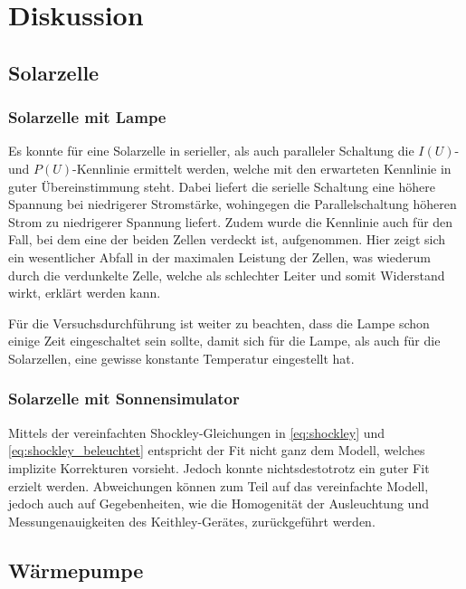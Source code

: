 \documentclass[english, ngerman]{scrartcl}
\begin{document}
\section{Diskussion}
\label{sec:diskussion}

\subsection{Solarzelle}
\label{subsec:diskussion_solar}

\subsubsection{Solarzelle mit Lampe}
\label{subsubsec:diskussion_solar_lampe}

Es konnte für eine Solarzelle in serieller, als auch paralleler Schaltung die $I(U)$- und $P(U)$-Kennlinie ermittelt werden, welche mit den erwarteten Kennlinie in guter Übereinstimmung steht. Dabei liefert die serielle Schaltung eine höhere Spannung bei niedrigerer Stromstärke, wohingegen die Parallelschaltung höheren Strom zu niedrigerer Spannung liefert. Zudem wurde die Kennlinie auch für den Fall, bei dem eine der beiden Zellen verdeckt ist, aufgenommen. Hier zeigt sich ein wesentlicher Abfall in der maximalen Leistung der Zellen, was wiederum durch die verdunkelte Zelle, welche als schlechter Leiter und somit Widerstand wirkt, erklärt werden kann.

Für die Versuchsdurchführung ist weiter zu beachten, dass die Lampe schon einige Zeit eingeschaltet sein sollte, damit sich für die Lampe, als auch für die Solarzellen, eine gewisse konstante Temperatur eingestellt hat.

\subsubsection{Solarzelle mit Sonnensimulator}
\label{subsubsec:diskussion_solar_sonnensimulator}

Mittels der vereinfachten Shockley-Gleichungen in \ref{eq:shockley} und \ref{eq:shockley_beleuchtet} entspricht der Fit nicht ganz dem Modell, welches implizite Korrekturen vorsieht. Jedoch konnte nichtsdestotrotz ein guter Fit erzielt werden. Abweichungen können zum Teil auf das vereinfachte Modell, jedoch auch auf Gegebenheiten, wie die Homogenität der Ausleuchtung und Messungenauigkeiten des Keithley-Gerätes, zurückgeführt werden.


\subsection{Wärmepumpe}
\label{subsec:diskussion_waermepumpe}
\end{document}
